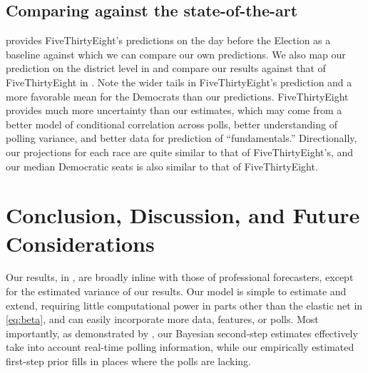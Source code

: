 \documentclass[12pt, letterpaper]{article}
\begin{document}
\subsection{Comparing against the state-of-the-art}

 provides FiveThirtyEight's predictions on the day before the
Election as a baseline against which we can compare our own predictions. 
We also map our prediction on the district level in  and compare our results against that of FiveThirtyEight in .
Note
the wider tails in FiveThirtyEight's prediction and a more favorable mean for
the Democrats than our predictions. FiveThirtyEight provides much more
uncertainty than our estimates, which may come from a better model of
conditional correlation across polls, better understanding of polling variance, and better data for prediction of ``fundamentals.'' Directionally, our projections for each race are quite similar to that of FiveThirtyEight's, and our median Democratic seats is also similar to that of FiveThirtyEight.


\section{Conclusion, Discussion, and Future Considerations}
\label{sec:conc} 

Our results, in , are broadly inline with those of professional forecasters, except for the estimated variance of our results. Our model is simple to estimate and extend, requiring little computational power in parts other than the elastic net in \eqref{eq:beta}, and can easily incorporate more data, features, or polls. Most importantly, as demonstrated by , our Bayesian second-step estimates effectively take into account real-time polling information, while our empirically estimated first-step prior fills in places where the polls are lacking. 
\end{document}

